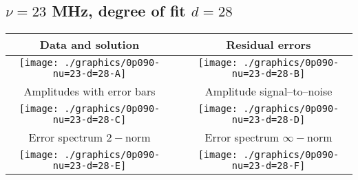 

% 

\clearpage{}
\break{}

\subsection{$\nu = 23$ MHz, degree of fit $d = 28$}

\begin{table}[h]
    \begin{center}
        \begin{tabular}{ccc}
            Data and solution & \quad & Residual errors \\\hline
            \texttt{[image: ./graphics/0p090-nu=23-d=28-A]} &&
            \texttt{[image: ./graphics/0p090-nu=23-d=28-B]} \\[15pt]
            Amplitudes with error bars && Amplitude signal--to--noise \\\hline
            \texttt{[image: ./graphics/0p090-nu=23-d=28-C]} &&
            \texttt{[image: ./graphics/0p090-nu=23-d=28-D]} \\[15pt]
            Error spectrum $2-$norm && Error spectrum $\infty-$norm \\\hline
            \texttt{[image: ./graphics/0p090-nu=23-d=28-E]} &&
            \texttt{[image: ./graphics/0p090-nu=23-d=28-F]} \\[15pt]
        \end{tabular}
    \end{center}
\label{fig:elev=90, nu=23}
\end{table}



\endinput
